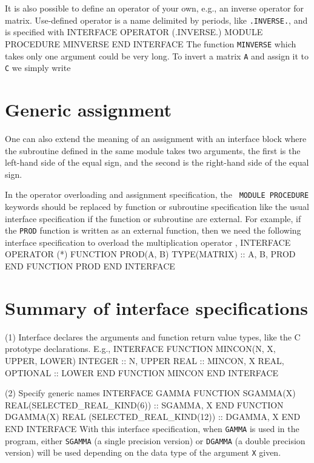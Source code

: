 {{It is also possible to define an operator of your own, e.g., an
inverse operator for matrix.  Use-defined operator is  a
name delimited by periods, like {\tt .INVERSE.}, and is specified with 
\ttbg
INTERFACE OPERATOR (.INVERSE.)
   MODULE PROCEDURE MINVERSE
END INTERFACE
\tted
The function {\tt MINVERSE} which takes only one argument could be very long. 
To invert a matrix {\tt A} and assign it to {\tt C} we simply write
\sms
{}
\sms

\section{Generic assignment}
One can also extend the meaning of an assignment with an interface block
\sms
{}
\sms
where the subroutine defined in the same module takes two arguments,
the first is the left-hand side of the equal sign, and the second is
the right-hand side of the equal sign. 

In the operator overloading and assignment specification, the {\tt 
MODULE PROCEDURE} keywords should be replaced by function or
subroutine specification like the usual interface specification if
the function or subroutine are external.  For example, if the {\tt PROD}
function is written as an external function, then we need the following
interface specification to overload the multiplication operator {\tt *},
\ttbg
INTERFACE OPERATOR (*)
   FUNCTION PROD(A, B)
      TYPE(MATRIX) :: A, B, PROD
   END FUNCTION PROD
END INTERFACE
\tted

\section{Summary of interface specifications}
(1) Interface declares the arguments and function return value types, like
the C prototype declarations. E.g.,
\ttbg
INTERFACE
   FUNCTION MINCON(N, X, UPPER, LOWER)
      INTEGER :: N, UPPER
      REAL :: MINCON, X
      REAL, OPTIONAL :: LOWER
   END FUNCTION MINCON
END INTERFACE
\tted

(2) Specify generic names
\ttbg
INTERFACE GAMMA
   FUNCTION SGAMMA(X)
      REAL(SELECTED_REAL_KIND(6)) :: SGAMMA, X
   END
   FUNCTION DGAMMA(X)
      REAL (SELECTED_REAL_KIND(12)) :: DGAMMA, X
   END
END INTERFACE
\tted
With this interface specification, when {\tt GAMMA} is used in the 
program, either {\tt SGAMMA} (a single precision version) or
{\tt DGAMMA} (a double precision version) will be used depending on 
the data type of the argument {\tt X} given.

}}
